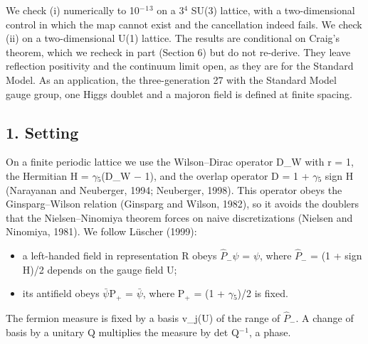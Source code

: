 \documentclass[
  11pt,
]{article}
\providecommand{\tightlist}{%
  \setlength{\itemsep}{0pt}\setlength{\parskip}{0pt}}
\begin{document}
We check (i) numerically to 10\ensuremath{^{-}}\ensuremath{^{1}}\ensuremath{^{3}} on a 3\ensuremath{^{4}} SU(3) lattice, with a two-dimensional control in which the map cannot exist and the cancellation indeed fails. We check (ii) on a two-dimensional U(1) lattice. The results are conditional on Craig's theorem, which we recheck in part (Section 6) but do not re-derive. They leave reflection positivity and the continuum limit open, as they are for the Standard Model. As an application, the three-generation 27 with the Standard Model gauge group, one Higgs doublet and a majoron field is defined at finite spacing.

\hypertarget{setting}{%
\subsection{1. Setting}\label{setting}}

On a finite periodic lattice we use the Wilson--Dirac operator D\_W with r = 1, the Hermitian H = \ensuremath{\gamma}\ensuremath{_{5}}(D\_W \ensuremath{-} 1), and the overlap operator D = 1 + \ensuremath{\gamma}\ensuremath{_{5}} sign H (Narayanan and Neuberger, 1994; Neuberger, 1998). This operator obeys the Ginsparg--Wilson relation (Ginsparg and Wilson, 1982), so it avoids the doublers that the Nielsen--Ninomiya theorem forces on naive discretizations (Nielsen and Ninomiya, 1981). We follow Lüscher (1999):

\begin{itemize}
\tightlist
\item
  a left-handed field in representation R obeys \ensuremath{\hat{P}}\ensuremath{_{-}}\ensuremath{\psi} = \ensuremath{\psi}, where \ensuremath{\hat{P}}\ensuremath{_{-}} = (1 + sign H)/2 depends on the gauge field U;
\item
  its antifield obeys \ensuremath{\bar{\ensuremath{\psi}}}P\ensuremath{_{+}} = \ensuremath{\bar{\ensuremath{\psi}}}, where P\ensuremath{_{+}} = (1 + \ensuremath{\gamma}\ensuremath{_{5}})/2 is fixed.
\end{itemize}

The fermion measure is fixed by a basis v\_j(U) of the range of \ensuremath{\hat{P}}\ensuremath{_{-}}. A change of basis by a unitary Q multiplies the measure by det Q\ensuremath{^{-}}\ensuremath{^{1}}, a phase.
\end{document}

